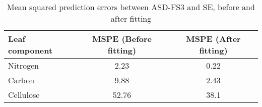 \begin{table}[H]
\centering
\begin{tabular}{l|c|c}
\hline
\hline
Leaf component & MSPE (Before fitting) & MSPE (After fitting) \\
\hline
Nitrogen & 2.23 & 0.22 \\
Carbon & 9.88 & 2.43\\
Cellulose & 52.76 & 38.1 \\
\hline
\hline
\end{tabular}
\caption{Mean squared prediction errors between ASD-FS3 and SE, before and after fitting}
\label{tab:tab1.1}
\end{table}
 
